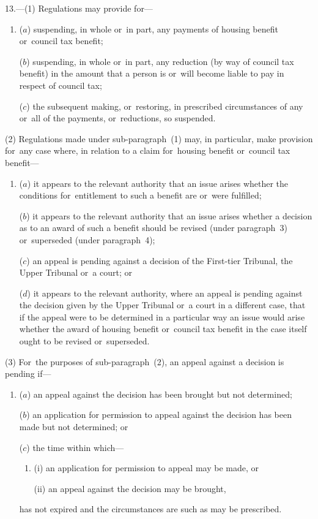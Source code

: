 \documentclass[12pt,a4paper]{article}
\begin{document}
13.---(1) Regulations may provide for—
\begin{enumerate}\item[]
($a$) suspending, in whole or~in part, any payments of housing benefit or~council tax benefit;

($b$) suspending, in whole or~in part, any reduction (by way of council tax benefit) in the amount that a person is or~will become liable to pay in respect of council tax;

($c$) the subsequent making, or~restoring, in prescribed circumstances of any or~all of the payments, or~reductions, so suspended.
\end{enumerate}

(2) Regulations made under sub-paragraph~(1)  may, in particular, make provision for~any case where, in relation to a claim for~housing benefit or~council tax benefit—
\begin{enumerate}\item[]
($a$) it appears to the relevant authority that an issue arises whether the conditions for~entitlement to such a benefit are or~were fulfilled;

($b$) it appears to the relevant authority that an issue arises whether a decision as to an award of such a benefit should be revised (under paragraph~3) or~superseded (under paragraph~4);

($c$) an appeal is pending against a decision of 
the First-tier Tribunal, the Upper Tribunal  %
or~a court; or

($d$) it appears to the relevant authority, where an appeal is pending against the decision given by 
the Upper Tribunal  %
or~a court in a different case, that if the appeal were to be determined in a particular way an issue would arise whether the award of housing benefit or~council tax benefit in the case itself ought to be revised or~superseded.
\end{enumerate}

(3) For~the purposes of sub-paragraph~(2), an appeal against a decision is pending if—
\begin{enumerate}\item[]
($a$) an appeal against the decision has been brought but not determined;

($b$) an application for 
permission  %
to appeal against the decision has been made but not determined; or

($c$) the time within which—
\begin{enumerate}\item[]
(i) an application for
permission  %
to appeal may be made, or

(ii) an appeal against the decision may be brought,
\end{enumerate}
has not expired and the circumstances are such as may be prescribed.
\end{enumerate}
\end{document}
